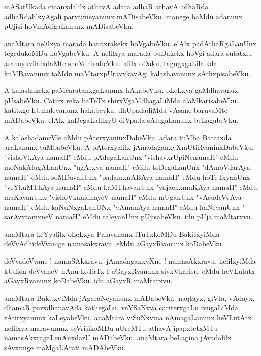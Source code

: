 \documentclass{article}
\begin{document}
\begin{mn}%
mASatUkada cinanxdalilx athavA adara adhaR athavA adhaRda adhaRdalilxyAgali parxtimeyanunx 
mADisabeVku. manege baMdu adanunx pUjisi hoVmAdigaLanunx mADisabeVku.
\end{mn}

\begin{mn}%
anaMtara nelilxya marada hatitxrakekx hoVgabeVku. elAlx padAthaRgaLanUnx tegedukoMDu hoVgabeVku. A 
nelilxya marada buDakekx hoVgi adara sutatxlu asahayxvilalxdaMte shoVdhisabeVku. alilx oDaku, 
tagugxgaLilalxda kuMBavanunx taMdu maMtarxpUravxkavAgi kalashavanunx sAthxpisabeVku.
\end{mn}

\begin{mn}%
A kalashakekx paMcaratanxgaLanunx hAkabeVku. oLeLxya gaMdhavanux pUsabeVku. Catirx reka baTeTx 
shirxVgaMdhagaLiMda alaMkarisabeVku. katitxge hUmaleyanunx hakabevku. dhUpadadiMda vAsane 
baruvaMte mADabeVku. elAlx kaDegaLalilxyU diVpada sAlugaLanunx beLagabeVku.
\end{mn}

\begin{mn}%
A kalashadameVle oMdu pAterxyaninxDabeVku. adara tuMba Batatxda araLanunx tuMbabeVku. A 
pAterxyalilx jAmadaganxyXmUtiRyaninxDabeVku. "vishoVkAya namaH"  eMdu pAdagaLanUnx 
"vishavxrUpiNenamaH" eMdu moNakAlugALanUnx "ugArxya namaH" eMdu toDegaLanUnx "dAmoVdarAya namaH" 
eMdu soMDavanUnx "padamxnABAya namaH" eMdu hoTeTxyanUnx "veYkuMThAya namaH" eMdu kaMThavanUnx 
"yajacnxmuKAya namaH" eMdu muKavanUnx "vishoVkanidhayeV namaH" eMdu mUganUnx "vAsudeVvAya namaH" 
eMdu kaNuNxgaLanUNx "vAmanAya namaH" eMdu haNeyanUnx " sarAvxtamxneV namaH" eMdu taleyanUnx 
pUjisabeVku. idu pUja maMtarxvu.
\end{mn}

\begin{mn}%
anaMtara keYyalilx oLeLxya Palavanunx iTuTxkoMDu BakitxyiMda deVvAdhideVvanige namasakxravu. eMdu 
aGayxRvanunx koDabeVku.
\end{mn}

\begin{mn}%
deVvadeVvane ! namaSAkxravu. jAmadaganxyXne ! namasAkxravu. nelilxyiMda kUdida deVvaneV nAnu koTaTx 
I aGayxRvanunx sivxVkarisu. eMdu heVLutatx aGayxRvanunx koDabeVku. idu aGayxR maMtarxvu.
\end{mn}

\begin{mn}%
anaMtara BakitxyiMda jAgaraNeyanunx mADabeVku. naqtayx, giVta, vAdayx, dhamaR parxdhanavAda 
kathegaLu, veYSaNxva cariterxgaLu ivugaLiMda rAtirxyanunx kaLeyabeVku. anaMtara viSuNxvina 
nAmagaLanunx heVLutAtx nelilxya maravanunx seVrisikoMDu nUreMTu athavA ipapxtetxMTu 
namasAkxragaLenAnxdarU mADabeVku. anaMtara beLagina jAvadalilx sAvxmige maMgaLArati mADAbeVku.
\end{mn}
\end{document}
